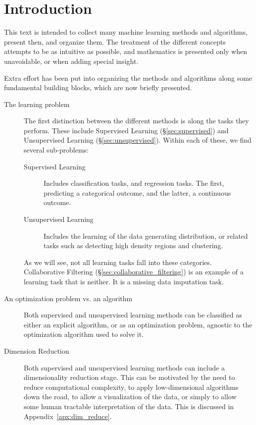 \chapter{Introduction}


This text is intended to collect many machine learning methods and algorithms, present then, and organize them.
The treatment of the different concepts attempts to be as intuitive as possible, and mathematics is presented only when unavoidable, or when adding special insight.

Extra effort has been put into organizing the methods and algorithms along some fundamental building blocks, which are now briefly presented.

\begin{description}

\item[The learning problem]
The first distinction between the different methods is along the tasks they perform. 
These include Supervised Learning (\S\ref{sec:supervised}) and Unsupervised Learning (\S\ref{sec:unsupervised}).
Within each of these, we find several sub-problems: 
	\begin{description}
	\item[Supervised Learning] Includes classification tasks, and regression tasks. The first, predicting a categorical outcome, and the latter, a continuous outcome.
	\item[Unsupervised Learning] Includes the learning of the data generating distribution, or related tasks such as detecting high density regions and clustering.
	\end{description}

As we will see, not all learning tasks fall into these categories. Collaborative Filtering (\S\ref{sec:collaborative_filtering}) is an example of a learning task that is neither. It is a missing data imputation task.

\item[An optimization problem vs. an algorithm]
Both supervised and unsupervised learning methods can be classified as either an explicit algorithm, or as an optimization problem, agnostic to the optimization algorithm used to solve it.

\item[Dimension Reduction]
Both supervised and unsupervised learning methods can include a dimensionality reduction stage. 
This can be motivated by the need to reduce computational complexity, to apply low-dimensional algorithms down the road, to allow a visualization of the data, or simply to allow some human tractable interpretation of the data.
This is discussed in Appendix~\ref{apx:dim_reduce}.


\end{description}
